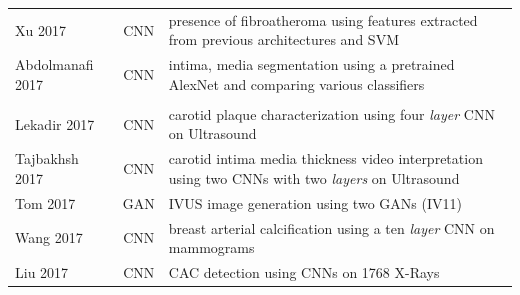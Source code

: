 \documentclass[journal]{IEEEtran}
\begin{document}
\begin{table}[!t]
\begin{minipage}{\textwidth}
\begin{tabularx}{\textwidth}{l c l}
			Xu 2017\cite{xu2017fibroatheroma}            & CNN             & presence of fibroatheroma using features extracted from previous architectures and SVM                                                                                                                                           \\
			Abdolmanafi 2017\cite{abdolmanafi2017deep}   & CNN             & intima, media segmentation using a pretrained AlexNet and comparing various classifiers                                                                                                                                          \\
			\midrule
			\multicolumn{3}{l}{\thead{Other imaging modalities}}                                                                                                                                                                                                                                              \\
			\midrule
			Lekadir 2017\cite{lekadir2017convolutional}  & CNN             & carotid plaque characterization using four \textit{layer} CNN on Ultrasound                                                                                                                                                      \\
			Tajbakhsh 2017\cite{tajbakhsh2017automatic}  & CNN             & carotid intima media thickness video interpretation using two CNNs with two \textit{layers} on Ultrasound                                                                                                                        \\
			Tom 2017\cite{tom2018simulating}             & GAN             & IVUS image generation using two GANs (IV11)                                                                                                                                                                                      \\
			Wang 2017\cite{wang2017detecting}            & CNN             & breast arterial calcification using a ten \textit{layer} CNN on mammograms                                                                                                                                                       \\
			Liu 2017\cite{liu2017coronary}               & CNN             & CAC detection using CNNs on 1768 X-Rays                                                                                                                                                                                          \\

\end{tabularx}
\end{minipage}
\end{table}
\end{document}
